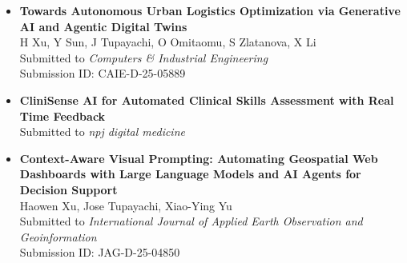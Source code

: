 \documentclass[10pt, letterpaper]{article}
\begin{document}
\begin{itemize}[left=0pt] 

    \item \textbf{Towards Autonomous Urban Logistics Optimization via Generative AI and Agentic Digital Twins} \\
    H Xu, Y Sun, J Tupayachi, O Omitaomu, S Zlatanova, X Li \\
    Submitted to \textit{Computers \& Industrial Engineering} \\
    Submission ID: CAIE-D-25-05889 \\




    \item \textbf{CliniSense AI for Automated Clinical Skills Assessment with Real Time Feedback}  \\
    Submitted to \textit{npj digital medicine} \\




            \item \textbf{Context-Aware Visual Prompting: Automating Geospatial Web Dashboards with Large Language Models and AI Agents for Decision Support}\\
            Haowen Xu, Jose Tupayachi, Xiao-Ying Yu\\
            Submitted to \textit{International Journal of Applied Earth Observation and Geoinformation} \\
            Submission ID: JAG-D-25-04850 \\



\end{itemize}
\end{document}
